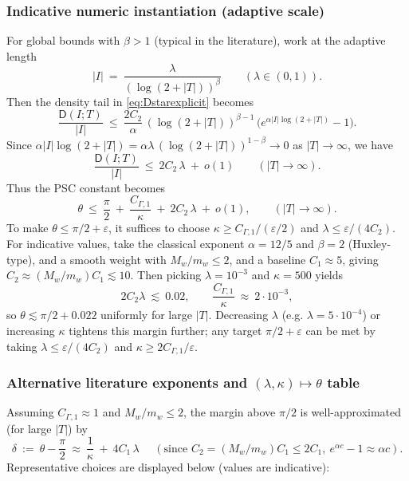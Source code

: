\documentclass[11pt]{article}
\theoremstyle{remark}
\begin{document}
\subsubsection*{Indicative numeric instantiation (adaptive scale)}
For global bounds with $\beta>1$ (typical in the literature), work at the adaptive length
\[
  |I|\ =\ \frac{\lambda}{(\log(2+|T|))^{\beta}}\qquad (\lambda\in(0,1)).
\]
Then the density tail in \eqref{eq:Dstarexplicit} becomes
\[
  \frac{\mathsf D(I;T)}{|I|}\ \le\ \frac{2C_2}{\alpha}\,(\log(2+|T|))^{\beta-1}\,\Big(e^{\alpha |I|\log(2+|T|)}-1\Big).
\]
Since $\alpha |I|\log(2+|T|)=\alpha\lambda\,(\log(2+|T|))^{1-\beta}\to 0$ as $|T|\to\infty$, we have
\[
  \frac{\mathsf D(I;T)}{|I|}\ \le\ 2C_2\,\lambda\ +\ o(1)\qquad (|T|\to\infty).
\]
Thus the PSC constant becomes
\[
  \theta\ \le\ \frac{\pi}{2}\ +\ \frac{C_{\Gamma,1}}{\kappa}\ +\ 2C_2\,\lambda\ +\ o(1),\qquad (|T|\to\infty).
\]
To make $\theta\le \pi/2+\varepsilon$, it suffices to choose $\kappa\ge C_{\Gamma,1}/(\varepsilon/2)$ and $\lambda\le \varepsilon/(4C_2)$. For indicative values, take the classical exponent $\alpha=12/5$ and $\beta=2$ (Huxley-type), and a smooth weight with $M_w/m_w\le 2$, and a baseline $C_1\approx 5$, giving $C_2\approx (M_w/m_w)C_1\lesssim 10$. Then picking $\lambda=10^{-3}$ and $\kappa=500$ yields
\[
  2C_2\lambda\ \lesssim\ 0.02,\qquad \frac{C_{\Gamma,1}}{\kappa}\ \approx\ 2\cdot 10^{-3},
\]
so $\theta\lesssim \pi/2+0.022$ uniformly for large $|T|$. Decreasing $\lambda$ (e.g. $\lambda=5\cdot 10^{-4}$) or increasing $\kappa$ tightens this margin further; any target $\pi/2+\varepsilon$ can be met by taking $\lambda\le \varepsilon/(4C_2)$ and $\kappa\ge 2C_{\Gamma,1}/\varepsilon$.

\subsubsection*{Alternative literature exponents and $(\lambda,\kappa)\mapsto \theta$ table}
Assuming $C_{\Gamma,1}\approx 1$ and $M_w/m_w\le 2$, the margin above $\pi/2$ is well-approximated (for large $|T|$) by
\[
  \delta\ :=\ \theta-\frac{\pi}{2}\ \approx\ \frac{1}{\kappa}\ +\ 4C_1\,\lambda\,\,\quad (\text{since } C_2=(M_w/m_w)C_1\le 2C_1,\ e^{\alpha c}-1\approx \alpha c).
\]
Representative choices are displayed below (values are indicative):
\end{document}
